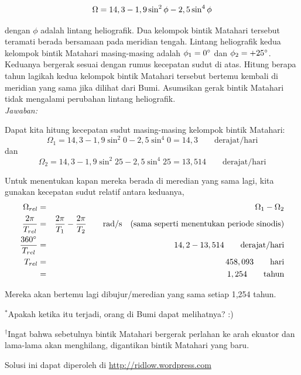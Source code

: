 \documentclass[11pt,fleqn]{exam}
\begin{document}
\begin{questions}
\begin{eqnarray*}
\centering
\Omega = 14,3 - 1,9 \sin^2 \phi - 2,5 \sin^4 \phi
\end{eqnarray*}

dengan $\phi$ adalah lintang heliografik. Dua kelompok bintik Matahari tersebut teramati berada bersamaan pada meridian tengah. Lintang heliografik kedua kelompok bintik Matahari masing-masing adalah $\phi_1=0\degree$ dan $\phi_2=+25\degree$. Keduanya bergerak sesuai dengan rumus kecepatan sudut di atas. Hitung berapa tahun lagikah kedua kelompok bintik Matahari tersebut bertemu kembali di meridian yang sama jika dilihat dari Bumi. Asumsikan gerak bintik Matahari tidak mengalami perubahan lintang heliografik.\\

\textit{Jawaban: } 

Dapat kita hitung kecepatan sudut masing-masing kelompok bintik Matahari:
$$\Omega_1 = 14,3 - 1,9 \sin^2{0} - 2,5 \sin^4{0} = 14,3 \qquad \text{derajat/hari}$$
dan
$$\Omega_2 = 14,3 - 1,9 \sin^2{25} - 2,5 \sin^4{25} = 13,514 \qquad \text{derajat/hari}$$

Untuk menentukan kapan mereka berada di meredian yang sama lagi, kita gunakan kecepatan sudut relatif antara keduanya,
\begin{eqnarray*}
\Omega_{rel} &=& \Omega_1 - \Omega_2\\
\frac{2 \pi}{T_{rel}} &=& \frac{2 \pi}{T_{1}} - \frac{2 \pi}{T_{2}} \qquad \text{rad/s} \quad \text{(sama seperti menentukan periode sinodis)}\\
\frac{360\degree}{T_{rel}} &=& 14,2 - 13,514 \qquad \text{derajat/hari}\\
T_{rel} &=& 458,093 \qquad \text{hari}\\
&=& 1,254 \qquad \text{tahun}
\end{eqnarray*}

Mereka akan bertemu lagi dibujur/meredian yang sama setiap 1,254 tahun. 

$^\ast$Apakah ketika itu terjadi, orang di Bumi dapat melihatnya? :)

$^\dagger$Ingat bahwa sebetulnya bintik Matahari bergerak perlahan ke arah ekuator dan lama-lama akan menghilang, digantikan bintik Matahari yang baru.


\end{questions}



\vspace{5cm}
\begin{flushright}
Solusi ini dapat diperoleh di \url{http://ridlow.wordpress.com}
\end{flushright}
\end{document}
